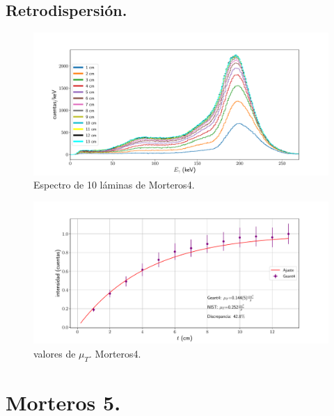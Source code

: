  
 \subsection{Retrodispersión.}
 
 \begin{figure}[H]
 	\centering
 	\includegraphics[width=1.0\linewidth]{Kap4/espectro_m4.pdf}
 	\caption{Espectro de 10 láminas de Morteros4.}
 	\label{fig:espectrom4}
 \end{figure}
 
 \begin{figure}[H]
 	\centering
 	\includegraphics[width=1.0\linewidth]{Kap4/mu_T-m4.pdf}
 	\caption{valores de $\mu_T$. Morteros4.}
 	\label{fig:mut-m4}
 \end{figure}
 
 
 
 
 \section{Morteros 5.}
 
